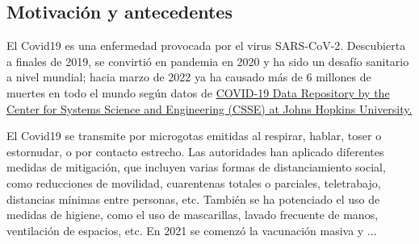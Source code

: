 \begin{intro}





\section*{Motivación y antecedentes}

El Covid19 es una enfermedad provocada por el virus SARS-CoV-2. Descubierta a finales de 2019, se convirtió en pandemia en 2020 y ha sido un desafío sanitario a nivel mundial; hacia marzo de 2022 ya ha causado más de 6 millones de muertes en todo el mundo según datos de \href{https://ourworldindata.org/explorers/coronavirus-data-explorer?facet=none&pickerSort=desc&pickerMetric=total_cases&Metric=Confirmed+deaths&Interval=Cumulative&Relative+to+Population=false&Color+by+test+positivity=false&country=~OWID_WRL}{COVID-19 Data Repository by the Center for Systems Science and Engineering (CSSE) at Johns Hopkins University.} 

El Covid19 se transmite por microgotas emitidas al respirar, hablar, toser o estornudar, o por contacto estrecho. Las autoridades han aplicado diferentes medidas de mitigación, que incluyen varias formas de distanciamiento social, como reducciones de movilidad, cuarentenas totales o parciales, teletrabajo, distancias mínimas entre personas, etc. También se ha potenciado el uso de medidas de higiene, como el uso de mascarillas, lavado frecuente de manos, ventilación de espacios, etc. En 2021 se comenzó la vacunación masiva y ...


\end{intro}
